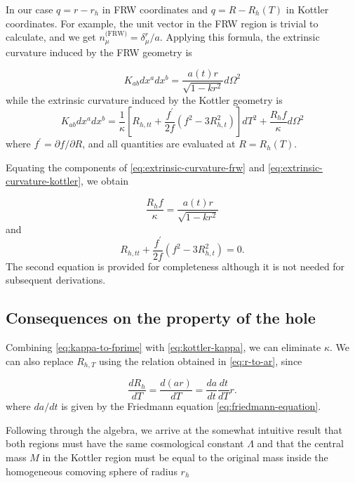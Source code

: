 In our case $q = r-r_h$ in FRW coordinates and $q = R - R_h(T)$ in Kottler coordinates. For example, the unit vector in the FRW region is trivial to calculate, and we get $n_{\mu}^{\text{(FRW)}} = \delta^r_{\mu}/a$. Applying this formula, the extrinsic curvature induced by the FRW geometry is

\begin{equation}
  K_{ab} dx^a dx^b = \frac{a(t)r}{\sqrt{1-kr^2}} d \Omega^2
  \label{eq:extrinsic-curvature-frw}
\end{equation}
while the extrinsic curvature induced by the Kottler geometry is
\begin{equation}
  K_{ab} dx^a dx^b = \frac{1}{\kappa} \left [ R_{h,tt} + \frac{f^{\prime}}{2f}(f^2 - 3R_{h,t}^2) \right ] dT^2 + \frac{R_h f}{\kappa} d \Omega^2
  \label{eq:extrinsic-curvature-kottler}
\end{equation}
where $f^{\prime} = \partial f / \partial R$, and all quantities are evaluated at $R = R_h(T)$.

Equating the components of \autoref{eq:extrinsic-curvature-frw} and \autoref{eq:extrinsic-curvature-kottler}, we obtain

\begin{equation}
  \frac{R_h f}{\kappa} = \frac{a(t)r}{\sqrt{1-kr^2}}
  \label{eq:kappa-to-fprime}
\end{equation}
and
\begin{equation}
  R_{h,tt} + \frac{f^{\prime}}{2f}(f^2 - 3R_{h,t}^2) = 0.
\end{equation}
The second equation is provided for completeness although it is not needed for subsequent derivations. 

\subsection{Consequences on the property of the hole}

Combining \autoref{eq:kappa-to-fprime} with \autoref{eq:kottler-kappa}, we can eliminate $\kappa$. We can also replace $R_{h,T}$ using the relation obtained in \autoref{eq:r-to-ar}, since

\begin{equation}
  \frac{dR_h}{dT} = \frac{d(ar)}{dT} = \frac{da}{dt}\frac{dt}{dT}r.
\end{equation}
where $da/dt$ is given by the Friedmann equation \ref{eq:friedmann-equation}. 

Following through the algebra, we arrive at the somewhat intuitive result that both regions must have the same cosmological constant $\Lambda$ and that the central mass $M$ in the Kottler region must be equal to the original mass inside the homogeneous comoving sphere of radius $r_h$

